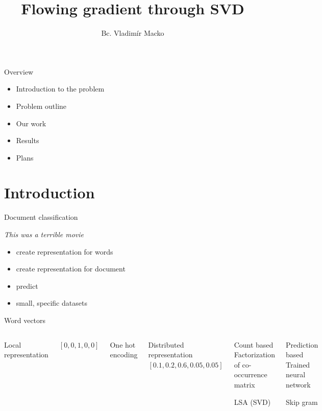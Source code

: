 \documentclass[xcolor={table}]{beamer}
\title{Flowing gradient through SVD}
\author{Bc. Vladimír Macko}
\institute{RNDr. Kristína Malinovská, PhD.}
\begin{document}
        
\begin{frame}
    \titlepage
\end{frame}
    
\begin{frame}{Overview}
    \begin{block}{}
        \begin{itemize}
            \item Introduction to the problem
            \item Problem outline
            \item Our work
            \item Results
            \item Plans
        \end{itemize}
    \end{block}
\end{frame}

\section{Introduction}
\begin{frame}{Document classification}
    \begin{block}{}
        \emph{This was a terrible movie}
    \end{block}
    
    \begin{block}{}   
        \begin{itemize}
            \item create representation for words
            \item create representation for document
            \item predict
            \item small, specific datasets
        \end{itemize}
    \end{block}
\end{frame} 

\begin{frame}{Word vectors}
    \begin{columns}
        Local representation
        
        $[0,0,1,0,0]$
        \begin{block}{}
            One hot encoding
        \end{block}

        Distributed representation
        $[0.1,0.2,0.6,0.05,0.05]$
        \begin{block}{Count based}
            Factorization of co-occurrence matrix
            
            LSA (SVD)
        \end{block}
        \begin{block}{Prediction based}
            Trained neural network

            Skip gram    
        \end{block}    
   \end{columns}
\end{frame} 
\end{document}
